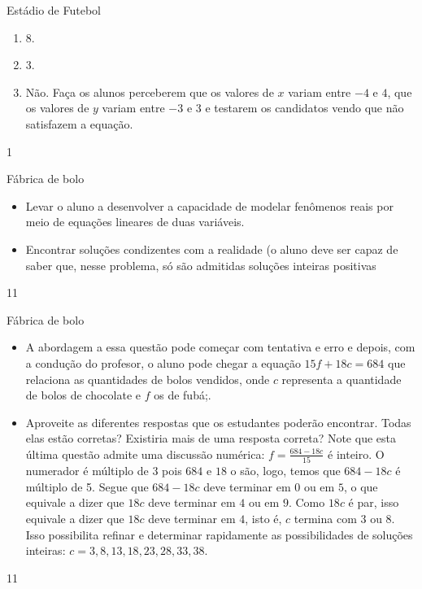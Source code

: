 \marginpar{\vspace{-1.5em}}
\begin{answer}{Estádio de Futebol}
{
\begin{enumerate}
\item $8.$
\item $3.$
\item Não. Faça os alunos perceberem que os valores de $x$ variam entre $-4$ e $4$, que os valores de $y$ variam entre $-3$ e $3$ e testarem os candidatos vendo que não satisfazem a equação.
\end{enumerate}
}{1}
\end{answer}
\clearmargin
\begin{objectives}{Fábrica de bolo}
{
\begin{itemize}
\item Levar o aluno a desenvolver a capacidade de modelar fenômenos reais por meio de equações lineares de duas variáveis.
\item Encontrar soluções condizentes com a realidade (o aluno deve ser capaz de saber que, nesse problema, só são admitidas soluções inteiras positivas
\end{itemize}
}{1}{1}
\end{objectives}
\begin{sugestions}{Fábrica de bolo}
{
\begin{itemize}
\item A abordagem a essa questão pode começar com tentativa  e erro e depois, com a condução do profesor, o aluno pode chegar a equação $15f+18c=684$ que relaciona as quantidades de bolos vendidos, onde $c$ representa a quantidade de bolos de chocolate e $f$ os de fubá;.
\item Aproveite as diferentes respostas que os estudantes poderão encontrar. Todas elas estão corretas? Existiria mais de uma resposta correta? Note que esta última questão admite uma discussão numérica:
$f=\frac{684-18c}{15}$ é inteiro. O numerador é múltiplo de $3$ pois $684$ e $18$ o são, logo, temos que $684 -18c$ é múltiplo de 5. Segue que $684-18c$ deve terminar em $0$ ou em $5$, o que equivale a dizer que $18c$ deve terminar em $4$ ou em $9$. Como $18c$ é par,  isso equivale a dizer que $18c$ deve terminar em $4$, isto é, $c$ termina com $3$ ou $8$. Isso possibilita refinar e determinar rapidamente as possibilidades de soluções inteiras: $c = 3, 8, 13, 18, 23, 28, 33, 38.$
\end{itemize}
}{1}{1}
\end{sugestions}
